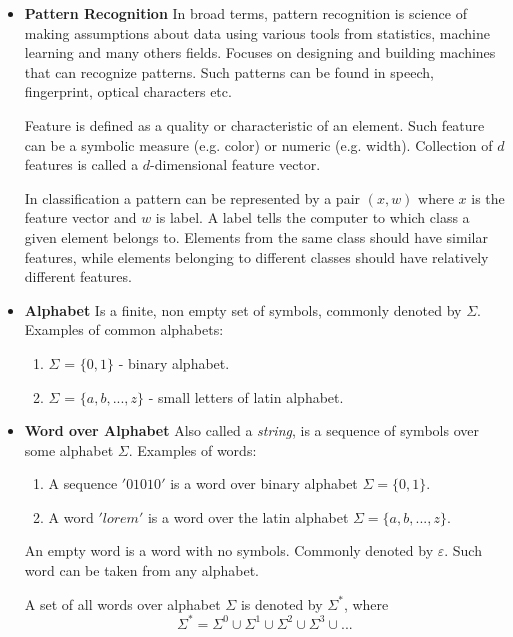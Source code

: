 \documentclass{article}
\begin{document}
\begin{itemize}

\item  {\bf Pattern Recognition}
In broad terms, pattern recognition is science of making assumptions about data using various tools from statistics, machine learning and many others fields.
Focuses on designing and building machines that can recognize patterns. Such patterns can be found in speech, fingerprint, optical characters etc.

Feature is defined as a quality or characteristic of an element.
Such feature can be a symbolic measure (e.g. color) or numeric (e.g. width).
Collection of $d$ features is called a $d$-dimensional feature vector.

In classification a pattern can be represented by a pair $(x,w)$ where $x$ is the feature vector and $w$ is label. A label tells the computer to which class a given element belongs to. Elements from the same class should have similar features, while elements belonging to different classes should have relatively different features.


\item {\bf Alphabet}
Is a finite, non empty set of symbols, commonly denoted by $\Sigma$.
Examples of common alphabets:
\begin{enumerate}
	\item $\Sigma$ = $\{0 ,1 \}$ - binary alphabet.
	\item $\Sigma$ = $\{a, b, ..., z\}$ - small letters of latin alphabet.
\end{enumerate}


\item {\bf Word over Alphabet}
Also called a \textit{string}, is a sequence of symbols over some alphabet $\Sigma$.
Examples of words:
\begin{enumerate}
	\item A sequence $'01010'$ is a word over binary alphabet $\Sigma=\{0,1\}$.
	\item A word $'lorem'$ is a word over the latin alphabet $\Sigma=\{a, b, ..., z\}$.
\end{enumerate}

An empty word is a word with no symbols. Commonly denoted by $\varepsilon$. Such word can be taken from any alphabet.

A set of all words over alphabet $\Sigma$ is denoted by $\Sigma^*$,
where 
\begin{equation}
\Sigma^* = \Sigma^0 \cup \Sigma^1 \cup \Sigma^2 \cup \Sigma^3 \cup ...
\end{equation}


\end{itemize}
\end{document}
